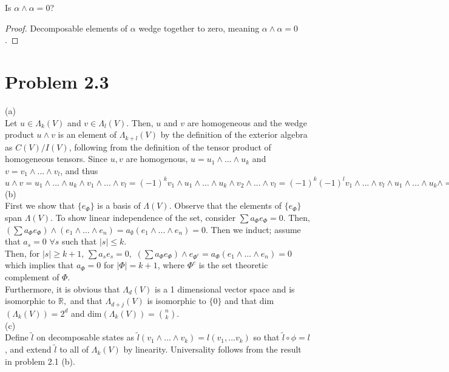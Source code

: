 \documentclass[paper=a4, fontsize=11pt]{scrartcl} %
\numberwithin{equation}{section} %
\numberwithin{figure}{section} %
\numberwithin{table}{section} %
\begin{document}
Is $\alpha \wedge \alpha = 0$?

\begin{proof}
Decomposable elements of $\alpha$ wedge together to zero, meaning $\alpha \wedge \alpha = 0$.
\end{proof}

\section*{Problem 2.3}

(a) \\ Let $u \in \Lambda_k (V)$ and $v \in \Lambda_l (V)$. Then, $u$ and $v$ are homogeneous and the wedge product $u \wedge v$ is an element of $\Lambda_{k+l} (V)$ by the definition of the exterior algebra as $C(V)/I(V)$, following from the definition of the tensor product of homogeneous tensors. Since $u,v$ are homogenous, $u = u_1 \wedge ...\wedge u_k$ and $v = v_1 \wedge ...\wedge v_l$, and thus $u \wedge v = u_1 \wedge ...\wedge u_k \wedge v_1 \wedge ...\wedge v_l = (-1)^k v_1 \wedge u_1 \wedge ...\wedge u_k \wedge v_2 \wedge ...\wedge v_l = (-1)^k (-1)^l v_1 \wedge ...\wedge v_l \wedge u_1 \wedge ...\wedge u_k \wedge = (-1)^{kl} v \wedge u$ \\

(b) \\ First we show that $\{e_{\Phi}\}$ is a basis of $\Lambda(V)$. Observe that the elements of $\{e_{\Phi}\}$ span $\Lambda(V)$. To show linear independence of the set, consider $\sum a_\Phi e_\Phi = 0$. Then, $(\sum a_\Phi e_\Phi) \wedge (e_1 \wedge ... \wedge e_n) = a_{\emptyset}(e_1 \wedge ... \wedge e_n) = 0.$ Then we induct; assume that $a_s = 0$ $\forall s$ such that $|s| \leq k$. \\
Then, for $|s| \geq k+1$,  $\sum a_s e_s = 0, $  $(\sum a_\Phi e_\Phi) \wedge e_{\Phi^c} = a_{\Phi}(e_1 \wedge ...\wedge e_n) = 0$ which implies that $a_\Phi = 0$ for $|\Phi| = k+1$, where $\Phi^c$ is the set theoretic complement of $\Phi$. \\

Furthermore, it is obvious that $\Lambda_d(V)$ is a 1 dimensional vector space and is isomorphic to $\mathbb{R},$ and that $\Lambda_{d+j}(V)$ is isomorphic to $\{0\}$ and that dim$(\Lambda_k(V)) = 2^d$ and dim$(\Lambda_k(V)) = {n \choose k}$. \\

(c) \\ Define $\widetilde{l}$ on decomposable states as $\widetilde{l}(v_1 \wedge ... \wedge v_k) = l(v_1,...v_k)$ so that $\widetilde{l} \circ \phi = l$, and extend $\widetilde{l}$ to all of $\Lambda_k (V)$ by linearity. Universality follows from the result in problem 2.1 (b).
\end{document}
